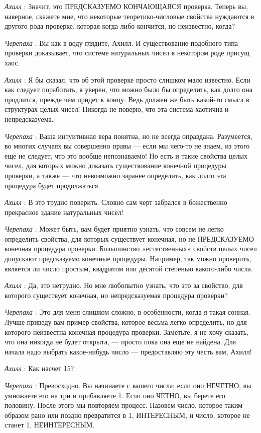 \emph{Ахилл} : Значит, это ПРЕДСКАЗУЕМО КОНЧАЮЩАЯСЯ проверка. Теперь вы, наверное, скажете мне, что некоторые теоретико-числовые свойства нуждаются в другого рода проверке, которая когда-либо кончится, но неизвестно, когда?

\emph{Черепаха} : Вы как в воду глядите, Ахилл. И существование подобного типа проверки доказывает, что системе натуральных чисел в некотором роде присущ хаос.

\emph{Ахилл} : Я бы сказал, что об этой проверке просто слишком мало известно. Если как следует поработать, я уверен, что можно было бы определить, как долго она продлится, прежде чем придет к концу. Ведь должен же быть какой-то смысл в структурах целых чисел! Никогда не поверю, что эта система хаотична и непредсказуема.

\emph{Черепаха} : Ваша интуитивная вера понятна, но не всегда оправдана. Разумеется, во многих случаях вы совершенно правы --- если мы чего-то не знаем, из этого еще не следует, что это вообще непознаваемо! Но есть и такие свойства целых чисел, для которых можно доказать существование конечной процедуры проверки, а также --- что невозможно заранее определить, как долго эта процедура будет продолжаться.

\emph{Ахилл} : В это трудно поверить. Словно сам черт забрался в божественно прекрасное здание натуральных чисел!

\emph{Черепаха} : Может быть, вам будет приятно узнать, что совсем не легко определить свойства, для которых существует конечная, но не ПРЕДСКАЗУЕМО конечная процедура проверки. Большинство «естественных» свойств целых чисел допускают предсказуемо конечные процедуры. Например, так можно проверить, является ли число простым, квадратом или десятой степенью какого-либо числа.

\emph{Ахилл} : Да, это нетрудно. Но мне любопытно узнать, что это за свойство, для которого существует конечная, но непредсказуемая процедура проверки?

\emph{Черепаха} : Это для меня слишком сложно, в особенности, когда я такая сонная. Лучше приведу вам пример свойства, которое весьма легко определить, но для которого неизвестна конечная процедура проверки. Заметьте, я не хочу сказать, что она никогда не будет открыта, --- просто пока она еще не найдена. Для начала надо выбрать какое-нибудь число --- предоставляю эту честь вам, Ахилл!

\emph{Ахилл} : Как насчет 15?

\emph{Черепаха} : Превосходно. Вы начинаете с вашего числа; если оно НЕЧЕТНО, вы умножаете его на три и прибавляете 1. Если оно ЧЕТНО, вы берете его половину. После этого мы повторяем процесс. Назовем число, которое таким образом рано или поздно превратится в 1, ИНТЕРЕСНЫМ, и число, которое не станет 1, НЕИНТЕРЕСНЫМ.

